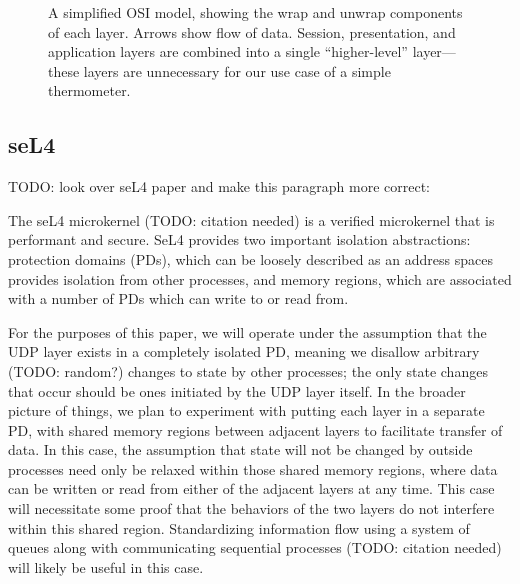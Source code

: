 \documentclass[twoside]{memoir}
\begin{document}
\begin{figure}[htpb]

    
    \caption{A simplified OSI model, showing the wrap and unwrap components of each layer. Arrows show flow of data. Session, presentation, and application layers are combined into a single ``higher-level'' layer---these layers are unnecessary for our use case of a simple thermometer.}
    \label{fig:network-stack}
\end{figure}

\subsection{seL4}

TODO: look over seL4 paper and make this paragraph more correct:

The seL4 microkernel (TODO: citation needed) is a verified microkernel
that is performant and secure.
SeL4 provides two important isolation abstractions: protection domains (PDs), which can be loosely described as an address spaces provides isolation from
other processes,
and memory regions, which are associated with a number of PDs which can write to or read from.

For the purposes of this paper, we will operate under the assumption that
the UDP layer exists in a completely isolated PD, meaning
we disallow arbitrary (TODO: random?) changes to state by other processes;
the only state changes that occur should be ones initiated by the UDP
layer itself.
In the broader picture of things, we plan to experiment with putting
each layer in a separate PD,
with shared memory regions between adjacent layers to facilitate transfer of data.
In this case, the assumption that state will not be changed by outside processes
need only be relaxed within those shared memory regions, where
data can be written or read from either of the adjacent layers at any time.
This case will necessitate some proof that the behaviors of the two layers
do not interfere within this shared region.
Standardizing information flow using a system of queues along with 
communicating sequential processes (TODO: citation needed)
will likely be useful in this case.
\end{document}
